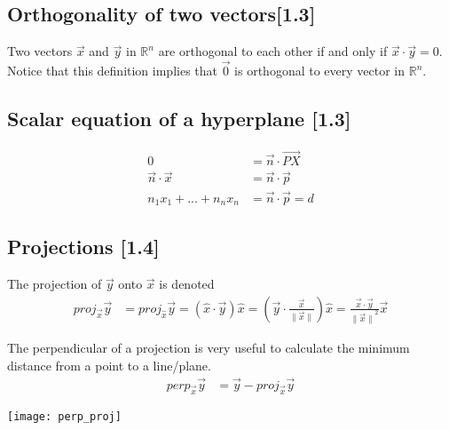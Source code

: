 \documentclass[a4paper,9pt]{extarticle}
\begin{document}
\begin{multicols*}{2}

\subsection{Orthogonality of two vectors[1.3]}
Two vectors $\vec{x}$ and $\vec{y}$ in $\mathbb{R}^n$ are orthogonal to each other if and only if $\vec{x} \cdot \vec{y} = 0$. Notice that this definition implies that $\vec{0}$ is orthogonal to every vector in $\mathbb{R}^n$.


\subsection{Scalar equation of a hyperplane [1.3]}
\begin{equation} \label{1.3-5}
    \begin{split}
        0 & = \vec{n} \cdot \vec{PX} \\
        \vec{n} \cdot \vec{x} & = \vec{n} \cdot \vec{p} \\
        n_1 x_1 + ... + n_n x_n & = \vec{n} \cdot \vec{p} = d
    \end{split}
\end{equation}


\subsection{Projections [1.4]}
The projection of $\vec{y}$ onto $\vec{x}$ is denoted
\begin{equation} \label{1.4-1}
    \begin{split}
        proj_{\vec{x}} \vec{y} & = proj_{\hat{x}} \vec{y} = (\hat{x} \cdot \vec{y}) \hat{x}
        = (\vec{y} \cdot \frac{\vec{x}}{\|\vec{x}\|}) \hat{x} = \frac{\vec{x} \cdot \vec{y}}{{\|\vec{x}\|}^2} \vec{x}
    \end{split}
\end{equation}

The perpendicular of a projection is very useful to calculate the minimum distance from a point to a line/plane.
\begin{equation} \label{1.4-2}
    \begin{split}
        perp_{\vec{x}} \vec{y} & = \vec{y} - proj_{\vec{x}} \vec{y}
    \end{split}
\end{equation}
{\centering \texttt{[image: perp\_proj]} \par}


\end{multicols*}
\end{document}
